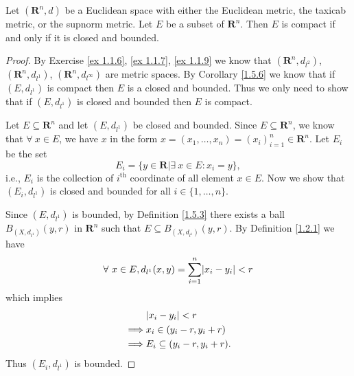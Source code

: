\begin{theorem}\label{1.5.7}
    Let \((\mathbf{R}^n, d)\) be a Euclidean space with either the Euclidean metric, the taxicab metric, or the supnorm metric.
    Let \(E\) be a subset of \(\mathbf{R}^n\).
    Then \(E\) is compact if and only if it is closed and bounded.
\end{theorem}

\begin{proof}
    By Exercise \ref{ex 1.1.6}, \ref{ex 1.1.7}, \ref{ex 1.1.9} we know that \((\mathbf{R}^n, d_{l^2})\), \((\mathbf{R}^n, d_{l^1})\), \((\mathbf{R}^n, d_{l^\infty})\) are metric spaces.
    By Corollary \ref{1.5.6} we know that if \((E, d_{l^1})\) is compact then \(E\) is a closed and bounded.
    Thus we only need to show that if \((E, d_{l^1})\) is closed and bounded then \(E\) is compact.

    Let \(E \subseteq \mathbf{R}^n\) and let \((E, d_{l^1})\) be closed and bounded.
    Since \(E \subseteq \mathbf{R}^n\), we know that \(\forall\ x \in E\), we have \(x\) in the form \(x = (x_1, \dots, x_n) = (x_i)_{i = 1}^n \in \mathbf{R}^n\).
    Let \(E_i\) be the set
    \[
        E_i = \{y \in \mathbf{R} | \exists\ x \in E : x_i = y\},
    \]
    i.e., \(E_i\) is the collection of \(i^{\text{th}}\) coordinate of all element \(x \in E\).
    Now we show that \((E_i, d_{l^1})\) is closed and bounded for all \(i \in \{1, \dots, n\}\).

    Since \((E, d_{l^1})\) is bounded, by Definition \ref{1.5.3} there exists a ball \(B_{(X, d_{l^1})}(y, r)\) in \(\mathbf{R}^n\) such that \(E \subseteq B_{(X, d_{l^1})}(y, r)\).
    By Definition \ref{1.2.1} we have
    \[
        \forall\ x \in E, d_{l^1}(x, y) = \sum_{i = 1}^n \abs*{x_i - y_i} < r
    \]
    which implies
    \begin{align*}
                 & \abs*{x_i - y_i} < r              \\
        \implies & x_i \in (y_i - r, y_i + r)        \\
        \implies & E_i \subseteq (y_i - r, y_i + r).
    \end{align*}
    Thus \((E_i, d_{l^1})\) is bounded.
\end{proof}
